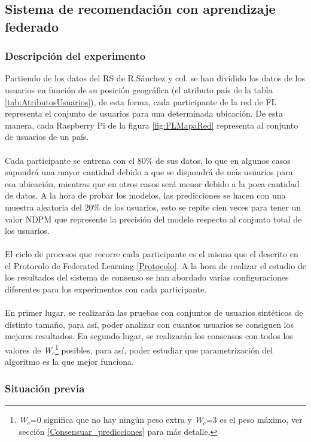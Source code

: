 \subsection{Sistema de recomendación con aprendizaje federado}

\subsubsection{Descripción del experimento}
Partiendo de los datos del RS de R.Sánchez y col. se han dividido los datos de los usuarios en función de su posición geográfica (el atributo país de la tabla \ref{tab:AtributosUsuarios}), de esta forma, cada participante de la red de FL representa el conjunto de usuarios para una determinada ubicación. De esta manera, cada Raspberry Pi de la figura \ref{fig:FLMapaRed} representa al conjunto de usuarios de un país.
\\\\
Cada participante se entrena con el 80\% de sus datos, lo que en algunos casos supondrá una mayor cantidad debido a que se dispondrá de más usuarios para esa ubicación, mientras que en otros casos será menor debido a la poca cantidad de datos. A la hora de probar los modelos, las predicciones se hacen con una muestra aleatoria del 20\% de los usuarios, esto se repite cien veces para tener un valor NDPM que represente la precisión del modelo respecto al conjunto total de los usuarios.
\\ \\
El ciclo de procesos que recorre cada participante es el mismo que el descrito en el Protocolo de Federated Learning \ref{Protocolo}. A la hora de realizar el estudio de los resultados del sistema de consenso se han abordado varias configuraciones diferentes para los experimentos con cada participante.
\\\\
En primer lugar, se realizarán las pruebas con conjuntos de usuarios sintéticos de distinto tamaño, para así, poder analizar con cuantos usuarios se consiguen los mejores resultados. En segundo lugar, se realizarán los consensos con todos los valores de \textit{W$_c$}\footnote{\textit{W$_c$}=0 significa que no hay ningún peso extra y \textit{W$_c$}=3 es el peso máximo, ver sección \ref{Consensuar_predicciones} para más detalle.} posibles, para así, poder estudiar que parametrización del algoritmo es la que mejor funciona.

\subsubsection{Situación previa}

